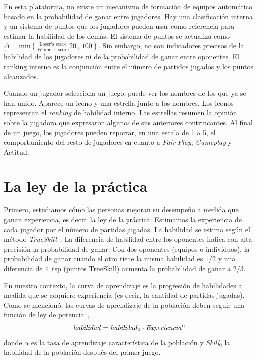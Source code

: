 \documentclass[a4paper,11pt]{book}
\theoremstyle{definition}
\begin{document}

En esta plataforma, no existe un mecanismo de formaci\'on de equipos autom\'atico basado en la probabilidad de ganar entre jugadores.
%
Hay una clasificaci\'on interna y un sistema de puntos que los jugadores pueden usar como referencia para estimar la habilidad de los dem\'as.
%
El sistema de puntos se actualiza como {\small $\Delta = \text{min}(\frac{\text{Loser's score}}{\text{Winner's score}}20\,,\,100 )$}.
%
Sin embargo, no son indicadores precisos de la habilidad de los jugadores ni de la probabilidad de ganar entre oponentes.
%
El ranking interno es la conjunci\'on entre el n\'umero de partidos jugados y los puntos alcanzados.


Cuando un jugador selecciona un juego, puede ver los nombres de los que ya se han unido.
%
Aparece un icono y una estrella junto a los nombres.
%
Los iconos representan el \emph{ranking} de habilidad interno.
%
Las estrellas resumen la opini\'on sobre la jugadora que expresaron algunos de sus anteriores contrincantes.
%
Al final de un juego, los jugadores pueden reportar, en una escala de 1 a 5, el comportamiento del resto de jugadores en cuanto a \emph{Fair Play}, \emph{Gameplay} y Actitud.
%



\section{La ley de la pr\'actica}

Primero, estudiamos c\'omo las personas mejoran su desempe\~no a medida que ganan experiencia, es decir, la ley de la pr\'actica.
%
Estimamos la experiencia de cada jugador por el n\'umero de partidas jugadas.
%
La habilidad se estima seg\'un el m\'etodo \emph{TrueSkill}~\cite{Herbrich2007}.
%
La diferencia de habilidad entre los oponentes indica con alta precisi\'on la probabilidad de ganar.
%
Con dos oponentes (equipos o individuos), la probabilidad de ganar cuando el otro tiene la misma habilidad es $1/2$ y una diferencia de $4$~tsp (puntos TrueSkill) aumenta la probabilidad de ganar a $2/3$.


En nuestro contexto, la curva de aprendizaje es la progresi\'on de habilidades a medida que se adquiere experiencia (es decir, la cantidad de partidas jugadas).
%
Como se mencion\'o, las curvas de aprendizaje de la poblaci\'on deben seguir una funci\'on de ley de potencia~\cite{Newell1981},
%
\begin{equation}\label{lawOfPractice}
   \text{\emph{habilidad}} = \text{\emph{habilidad}}_0 \cdot \text{\emph{Experiencia}}^{\alpha}
\end{equation}
%
donde $\alpha$ es la tasa de aprendizaje caracter\'istica de la poblaci\'on y \emph{Skill}$_0$ la habilidad de la poblaci\'on despu\'es del primer juego.
\end{document}
